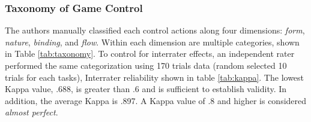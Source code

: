 \documentclass{sigchi}
\begin{document}
  \subsubsection{Taxonomy of Game Control}

  The authors manually classified each control actions along four dimensions: \emph{form}, \emph{nature}, \emph{binding}, and \emph{flow}. Within each dimension are multiple categories, shown in Table \ref{tab:taxonomy}. To control for interrater effects, an independent rater performed the same categorization using 170 trials data (random selected 10 trials for each tasks), Interrater reliability shown in table \ref{tab:kappa}. The lowest Kappa value, .688, is greater than .6 and is sufficient to establish validity. In addition, the average Kappa is .897. A Kappa value of .8 and higher is considered \textsl{almost perfect}.
\end{document}
